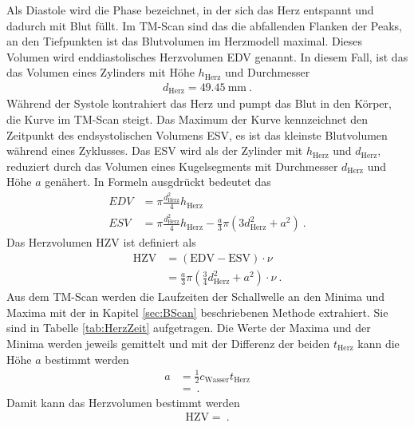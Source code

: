 Als Diastole wird die Phase bezeichnet, in der sich das Herz entspannt und dadurch mit Blut füllt. Im TM-Scan sind das die abfallenden Flanken der Peaks, an den Tiefpunkten ist das Blutvolumen im Herzmodell maximal. Dieses Volumen wird enddiastolisches Herzvolumen EDV genannt. In diesem Fall, ist das das Volumen eines Zylinders mit Höhe $h_\text{Herz}$ und Durchmesser
\begin{align}
        d_\text{Herz} = \SI{49.45}{\milli\meter} \ .
\end{align}
Während der Systole kontrahiert das Herz und pumpt das Blut in den Körper, die Kurve im TM-Scan steigt. Das Maximum der Kurve kennzeichnet den Zeitpunkt des endsystolischen Volumens ESV, es ist das kleinste Blutvolumen während eines Zyklusses. Das ESV wird als der Zylinder mit $h_\text{Herz}$ und $d_\text{Herz}$, reduziert durch das Volumen eines Kugelsegments mit Durchmesser $d_\text{Herz}$ und Höhe $a$ genähert. In Formeln ausgdrückt bedeutet das
\begin{align}
	EDV &= \pi \frac{d^2_\text{Herz}}{4} h_\text{Herz} \\
	ESV &= \pi \frac{d^2_\text{Herz}}{4} h_\text{Herz} - \frac{a}{3} \pi (3d_\text{Herz}^2 + a^2) \ .
\end{align}
Das Herzvolumen HZV ist definiert als
\begin{align}
	\text{HZV} &= (\text{EDV} - \text{ESV}) \cdot \nu \\
	&= \frac{a}{3} \pi (\frac{3}{4}d_\text{Herz}^2 + a^2) \cdot \nu \ .
\end{align}
Aus dem TM-Scan werden die Laufzeiten der Schallwelle an den Minima und Maxima mit der in Kapitel \ref{sec:BScan} beschriebenen Methode extrahiert. Sie sind in Tabelle \ref{tab:HerzZeit} aufgetragen. Die Werte der Maxima und der Minima werden jeweils gemittelt und mit der Differenz der beiden $t_\text{Herz}$ kann die Höhe $a$ bestimmt werden
\begin{align}
	a &= \frac{1}{2}c_\text{Wasser}t_\text{Herz} \\
	&=  \ .
\end{align}
Damit kann das Herzvolumen bestimmt werden
\begin{align}
	\text{HZV} =  \ .
\end{align}

